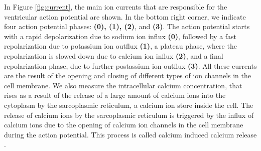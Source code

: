 \documentclass{article}
\begin{document}
%
In Figure \ref{fig:current}, the main ion currents that are responsible for the ventricular action potential are shown. In the bottom right corner, we indicate four action potential phases:  \textbf{(0), (1), (2)}, and \textbf{(3)}. The action potential starts with a rapid depolarization due to sodium ion influx \textbf{(0)}, followed by a fast repolarization due to potassium ion outflux \textbf{(1)}, a plateau phase, where the repolarization is slowed down due to calcium ion influx \textbf{(2)}, and a final repolarization phase, due to further postassium ion outflux \textbf{(3)}. All these currents are the result of the opening and closing of different types of ion channels in the cell membrane. We also measure the intracellular calcium concentration, that rises as a result of the release of a large amount of calcium ions into the cytoplasm by the sarcoplasmic reticulum, a calcium ion store inside the cell. The release of calcium ions by the sarcoplasmic reticulum is triggered by the influx of calcium ions due to the opening of calcium ion channels in the cell membrane during the action potential. This process is called calcium induced calcium release \cite{KeenerI}.
\end{document}
